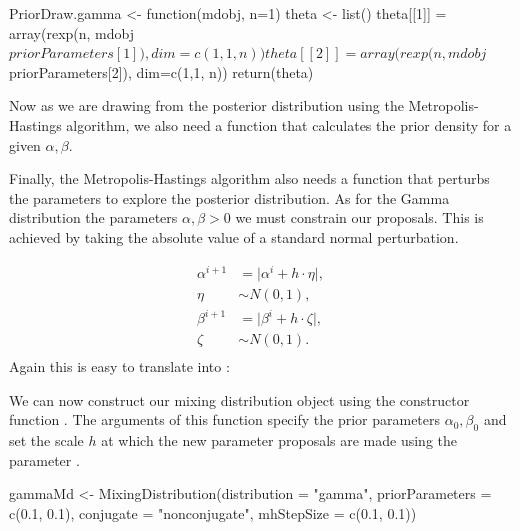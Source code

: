 \documentclass[nojss]{jss}
\begin{document}
\begin{CodeInput}
PriorDraw.gamma <- function(mdobj, n=1){
  theta <- list()
  theta[[1]] = array(rexp(n, mdobj$priorParameters[1]), dim=c(1,1, n))
  theta[[2]] = array(rexp(n, mdobj$priorParameters[2]), dim=c(1,1, n))
  return(theta)
}
\end{CodeInput}

Now as we are drawing from the posterior distribution using the Metropolis-Hastings algorithm, we also need a function that calculates the prior density for a given ${\alpha, \beta}$.

Finally, the Metropolis-Hastings algorithm also needs a function that perturbs the parameters to explore the posterior distribution. As for the Gamma distribution the parameters $\alpha, \beta >0$ we must constrain our proposals. This is achieved by taking the absolute value of a standard normal perturbation.

\begin{align*}
\alpha ^{i+1} & = \lvert \alpha ^{i} + h \cdot \eta \lvert ,\\
\eta & \sim N(0, 1), \\
\beta ^{i+1} & = \lvert \beta ^{i} + h \cdot \zeta \lvert, \\
\zeta & \sim N(0, 1). \\
\end{align*}
Again this  is easy to translate into :

We can now construct our mixing distribution object using the constructor function . The arguments of this function specify the prior parameters $\alpha _0, \beta _0$ and set the scale $h$ at which the new parameter proposals are made using the parameter .
\begin{CodeInput}
gammaMd <- MixingDistribution(distribution = "gamma",
                              priorParameters = c(0.1, 0.1),
                              conjugate = "nonconjugate",
                              mhStepSize = c(0.1, 0.1))
\end{CodeInput}
\end{document}
